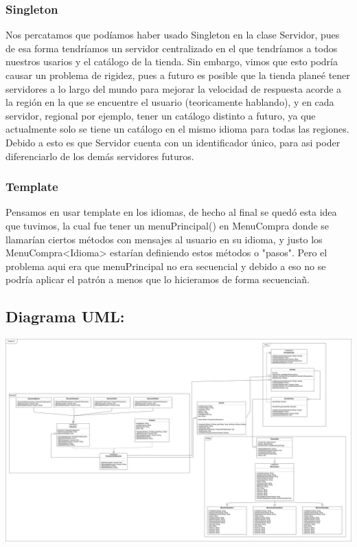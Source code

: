 \documentclass{article}
\begin{document}
\subsubsection*{Singleton}
Nos percatamos que podíamos haber usado Singleton en la clase Servidor, pues de esa forma
tendríamos un servidor centralizado en el que tendríamos a todos nuestros usarios y el catálogo
de la tienda. Sin embargo, vimos que esto podría causar un problema de rigidez, pues a futuro
es posible que la tienda planeé tener servidores a lo largo del mundo para mejorar la velocidad
de respuesta acorde a la región en la que se encuentre el usuario (teoricamente hablando), y
en cada servidor, regional por ejemplo, tener un catálogo distinto a futuro, ya que actualmente
solo se tiene un catálogo en el mismo idioma para todas las regiones. Debido a esto es que
Servidor cuenta con un identificador único, para asi poder diferenciarlo de los demás servidores
futuros.

\subsubsection*{Template}
Pensamos en usar template en los idiomas, de hecho al final se quedó esta idea que tuvimos, la cual fue tener un menuPrincipal() en MenuCompra donde se llamarían ciertos métodos con mensajes al usuario en su idioma, y justo los MenuCompra<Idioma> estarían definiendo estos métodos o "pasos". Pero el problema aqui era que menuPrincipal no era secuencial y debido a eso no se podría aplicar el patrón a menos que lo hicieramos de forma secuenciañ.

\newpage
\subsection*{Diagrama UML:}
\begin{center}
  \includegraphics[scale=0.14]{./Proyecto01UML.png}
\end{center}
\end{document}
